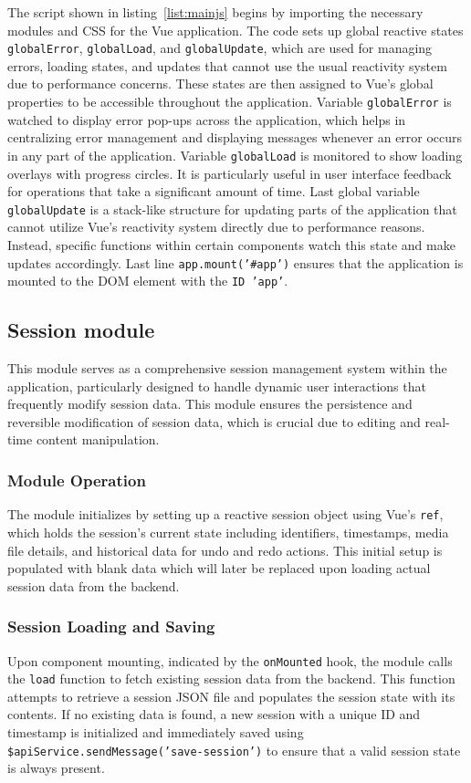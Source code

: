 The script shown in listing~\ref{list:mainjs} begins by importing the necessary modules and CSS for the Vue application. The code sets up global reactive states \texttt{globalError}, \texttt{globalLoad}, and \texttt{globalUpdate}, which are used for managing errors, loading states, and updates that cannot use the usual reactivity system due to performance concerns. These states are then assigned to Vue's global properties to be accessible throughout the application. Variable \texttt{globalError} is watched to display error pop-ups across the application, which helps in centralizing error management and displaying messages whenever an error occurs in any part of the application. Variable \texttt{globalLoad} is monitored to show loading overlays with progress circles. It is particularly useful in user interface feedback for operations that take a significant amount of time. Last global variable \texttt{globalUpdate} is a stack-like structure for updating parts of the application that cannot utilize Vue's reactivity system directly due to performance reasons. Instead, specific functions within certain components watch this state and make updates accordingly. Last line \texttt{app.mount('\#app')} ensures that the application is mounted to the DOM element with the \texttt{ID 'app'}.

\subsection{Session module}

This module serves as a comprehensive session management system within the application, particularly designed to handle dynamic user interactions that frequently modify session data. This module ensures the persistence and reversible modification of session data, which is crucial due to editing and real-time content manipulation.

\subsubsection{Module Operation}
The module initializes by setting up a reactive session object using Vue's \texttt{ref}, which holds the session's current state including identifiers, timestamps, media file details, and historical data for undo and redo actions. This initial setup is populated with blank data which will later be replaced upon loading actual session data from the backend.

\subsubsection{Session Loading and Saving}
Upon component mounting, indicated by the \texttt{onMounted} hook, the module calls the \texttt{load} function to fetch existing session data from the backend. This function attempts to retrieve a session JSON file and populates the session state with its contents. If no existing data is found, a new session with a unique ID and timestamp is initialized and immediately saved using \texttt{\$apiService.sendMessage('save-session')} to ensure that a valid session state is always present.

